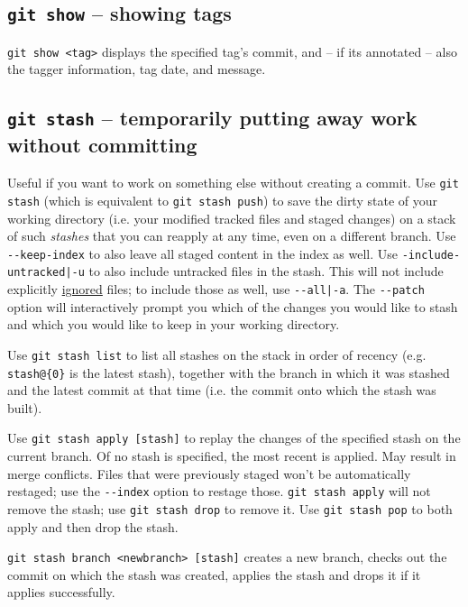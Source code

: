 \documentclass[8pt, table, xcdraw]{article}%
\begin{document}
\subsection{\lstinline{git show} -- showing tags} \label{show}

\lstinline{git show <tag>} displays the specified tag's commit, and -- if its annotated -- also the tagger information, tag date, and message.

\subsection{\lstinline{git stash} -- temporarily putting away work without committing} \label{stash}

Useful if you want to work on something else without creating a commit. Use \lstinline{git stash} (which is equivalent to \lstinline{git stash push}) to save the dirty state of your working directory (i.e. your modified tracked files and staged changes) on a stack of such \emph{stashes} that you can reapply at any time, even on a different branch. Use \lstinline{--keep-index} to also leave all staged content in the index as well. Use \lstinline{-include-untracked|-u} to also include untracked files in the stash. This will not include explicitly \hyperref[gitignore]{ignored} files; to include those as well, use \lstinline{--all|-a}. The \lstinline{--patch} option will interactively prompt you which of the changes you would like to stash and which you would like to keep in your working directory.

Use \lstinline{git stash list} to list all stashes on the stack in order of recency (e.g. \lstinline|stash@{0}| is the latest stash), together with the branch in which it was stashed and the latest commit at that time (i.e. the commit onto which the stash was built).

Use \lstinline{git stash apply [stash]} to replay the changes of the specified stash on the current branch. Of no stash is specified, the most recent is applied. May result in merge conflicts. Files that were previously staged won't be automatically restaged; use the \lstinline{--index} option to restage those. \lstinline{git stash apply} will not remove the stash; use \lstinline{git stash drop} to remove it. Use \lstinline{git stash pop} to both apply and then drop the stash.

\lstinline{git stash branch <newbranch> [stash]} creates a new branch, checks out the commit on which the stash was created, applies the stash and drops it if it applies successfully.
\end{document}
